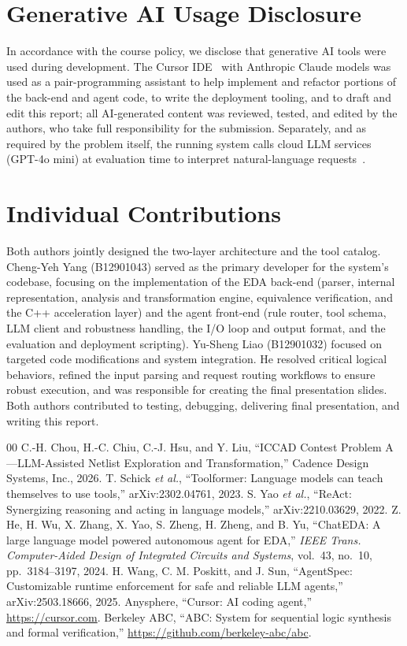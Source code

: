 \documentclass[conference]{IEEEtran}
\begin{document}
\section*{Generative AI Usage Disclosure}
In accordance with the course policy, we disclose that generative AI tools were
used during development. The Cursor IDE~\cite{cursor} with Anthropic Claude models was used as
a pair-programming assistant to help implement and refactor portions of the
back-end and agent code, to write the deployment tooling, and to draft and edit
this report; all AI-generated content was reviewed, tested, and edited by the
authors, who take full responsibility for the submission. Separately, and as
required by the problem itself, the running system calls cloud LLM services
(GPT-4o mini) at evaluation time to interpret
natural-language requests~\cite{problemA}.

\section*{Individual Contributions}
Both authors jointly designed the two-layer architecture and the tool catalog. 
Cheng-Yeh Yang (B12901043) served as the primary developer for the system's codebase, 
focusing on the implementation of the EDA back-end (parser, internal representation, 
analysis and transformation engine, equivalence verification, and the C++ acceleration layer) 
and the agent front-end (rule router, tool schema, LLM client and robustness handling, 
the I/O loop and output format, and the evaluation and deployment scripting). 
Yu-Sheng Liao (B12901032) focused on targeted code modifications and system integration. 
He resolved critical logical behaviors, refined the input parsing and request routing workflows to ensure robust execution, 
and was responsible for creating the final presentation slides. 
Both authors contributed to testing, debugging, delivering final presentation, and writing this report.

\begin{thebibliography}{00}
 C.-H. Chou, H.-C. Chiu, C.-J. Hsu, and Y. Liu, ``ICCAD
Contest Problem A---LLM-Assisted Netlist Exploration and Transformation,''
Cadence Design Systems, Inc., 2026.
 T. Schick \emph{et al.}, ``Toolformer: Language models can
teach themselves to use tools,'' arXiv:2302.04761, 2023.
 S. Yao \emph{et al.}, ``ReAct: Synergizing reasoning and acting
in language models,'' arXiv:2210.03629, 2022.
 Z. He, H. Wu, X. Zhang, X. Yao, S. Zheng, H. Zheng, and B.
Yu, ``ChatEDA: A large language model powered autonomous agent for EDA,''
\emph{IEEE Trans. Computer-Aided Design of Integrated Circuits and Systems},
vol.~43, no.~10, pp.~3184--3197, 2024.
 H. Wang, C. M. Poskitt, and J. Sun, ``AgentSpec:
Customizable runtime enforcement for safe and reliable LLM agents,''
arXiv:2503.18666, 2025.
 Anysphere, ``Cursor: AI coding agent,''
\url{https://cursor.com}.
 Berkeley ABC, ``ABC: System for sequential logic synthesis and
formal verification,'' \url{https://github.com/berkeley-abc/abc}.
\end{thebibliography}
\end{document}

